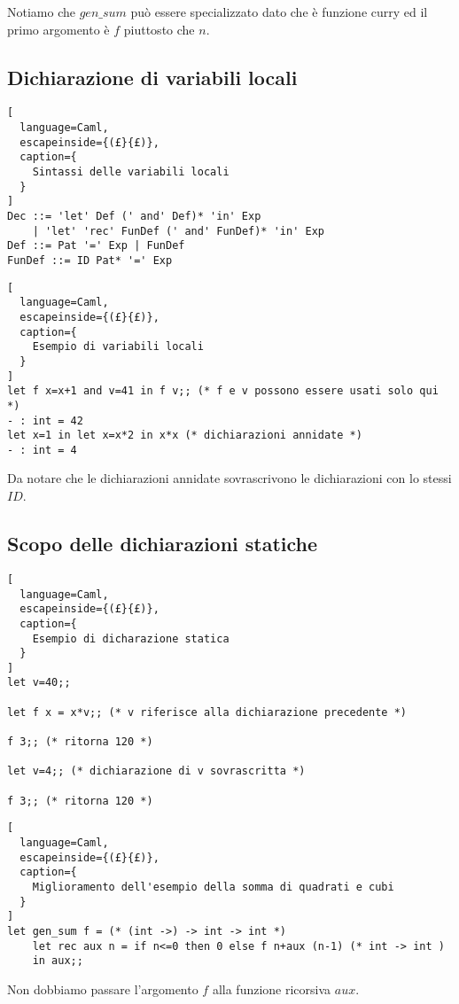 Notiamo che $gen\_sum$ può essere specializzato dato che è funzione curry
ed il primo argomento è $f$ piuttosto che $n$.

\subsection{Dichiarazione di variabili locali}
\begin{lstlisting}[
  language=Caml,
  escapeinside={(£}{£)},
  caption={
    Sintassi delle variabili locali
  }
]
Dec ::= 'let' Def (' and' Def)* 'in' Exp
    | 'let' 'rec' FunDef (' and' FunDef)* 'in' Exp
Def ::= Pat '=' Exp | FunDef
FunDef ::= ID Pat* '=' Exp
\end{lstlisting}

\begin{lstlisting}[
  language=Caml,
  escapeinside={(£}{£)},
  caption={
    Esempio di variabili locali
  }
]
let f x=x+1 and v=41 in f v;; (* f e v possono essere usati solo qui *)
- : int = 42
let x=1 in let x=x*2 in x*x (* dichiarazioni annidate *)
- : int = 4
\end{lstlisting}

Da notare che le dichiarazioni annidate sovrascrivono le dichiarazioni con
lo stessi $ID$.

\subsection{Scopo delle dichiarazioni statiche}
\begin{lstlisting}[
  language=Caml,
  escapeinside={(£}{£)},
  caption={
    Esempio di dicharazione statica
  }
]
let v=40;;

let f x = x*v;; (* v riferisce alla dichiarazione precedente *)

f 3;; (* ritorna 120 *)

let v=4;; (* dichiarazione di v sovrascritta *)

f 3;; (* ritorna 120 *)
\end{lstlisting}

\begin{lstlisting}[
  language=Caml,
  escapeinside={(£}{£)},
  caption={
    Miglioramento dell'esempio della somma di quadrati e cubi
  }
]
let gen_sum f = (* (int ->) -> int -> int *)
    let rec aux n = if n<=0 then 0 else f n+aux (n-1) (* int -> int )
    in aux;;
\end{lstlisting}

Non dobbiamo passare l'argomento $f$ alla funzione ricorsiva $aux$.

